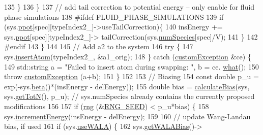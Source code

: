\begin{DoxyCode}
135                                                 \}
136         \}
137         \textcolor{comment}{// add tail correction to potential energy -- only enable for fluid phase simulations}
138 \textcolor{preprocessor}{#ifdef FLUID\_PHASE\_SIMULATIONS}
139         \textcolor{keywordflow}{if} (sys.\hyperlink{classsim_system_a8d6271751a62f61edcf57f773540a4a3}{ppot}[spec][typeIndex2\_]->useTailCorrection)\{
140                                                 insEnergy += sys.\hyperlink{classsim_system_a8d6271751a62f61edcf57f773540a4a3}{ppot}[spec][typeIndex2\_]->
      tailCorrection(sys.\hyperlink{classsim_system_a9eea865e6dc1cff377b1e79c4d9c23f0}{numSpecies}[spec]/V);
141                                 \}
142 \textcolor{preprocessor}{#endif}
143     \}
144 
145     \textcolor{comment}{// Add a2 to the system}
146     \textcolor{keywordflow}{try} \{
147                 sys.\hyperlink{classsim_system_a6c1e86f585f3a52aa82b6394ffbf1c6a}{insertAtom}(typeIndex2\_, &a1\_orig);
148     \} \textcolor{keywordflow}{catch} (\hyperlink{classcustom_exception}{customException} &ce) \{
149                 std::string a = \textcolor{stringliteral}{"Failed to insert atom during swapping: "}, b = ce.
      \hyperlink{classcustom_exception_aeb6ab5848b038adfc68fde86a512f691}{what}();
150                 \textcolor{keywordflow}{throw} \hyperlink{classcustom_exception}{customException} (a+b);
151     \}
152        
153     \textcolor{comment}{// Biasing}
154     \textcolor{keyword}{const} \textcolor{keywordtype}{double} p\_u = exp(-sys.\hyperlink{classsim_system_a3eeec9678902f8d7fce4dad6064aaf4c}{beta}()*(insEnergy - delEnergy));
155     \textcolor{keywordtype}{double} bias = \hyperlink{system_8cpp_ab912bbb9fc9045954cf1b3ccb286a55c}{calculateBias}(sys, sys.\hyperlink{classsim_system_a37dd827f4057049763351510147b9f1d}{getTotN}(), p\_u); \textcolor{comment}{// sys.numSpecies already
       contains the currently proposed modifications}
156     
157                 \textcolor{keywordflow}{if} (\hyperlink{utilities_8cpp_a0f9542af4b475ac79cb679d7a8d14db0}{rng} (&\hyperlink{global_8h_a3f4e4ea24d5a5c66feae55d1f329c884}{RNG\_SEED}) < p\_u*bias) \{
158                    sys.\hyperlink{classsim_system_a6ad31c08955b80873f865b3069618dcb}{incrementEnergy}(insEnergy - delEnergy);   
159                                 
160                                 \textcolor{comment}{// update Wang-Landau bias, if used}
161                                 \textcolor{keywordflow}{if} (sys.\hyperlink{classsim_system_aa83b00006b3919fb6e13f1bdeadece6a}{useWALA}) \{
162                                                 sys.\hyperlink{classsim_system_a7cb5049de8b0988349e89e30e4000407}{getWALABias}()->

\end{DoxyCode}
